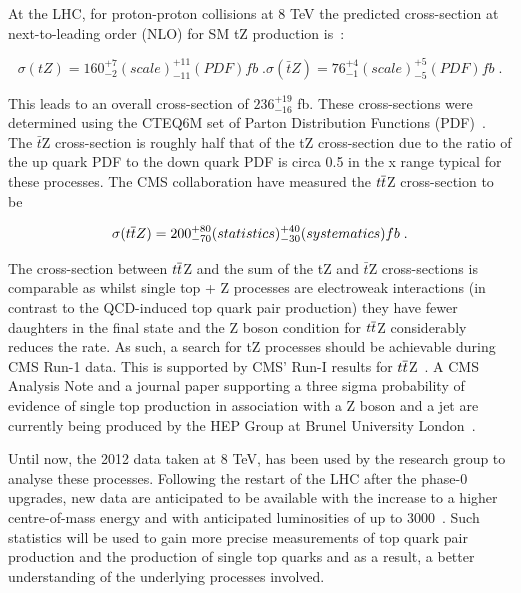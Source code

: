 At the LHC, for proton-proton collisions at 8 TeV the predicted cross-section at next-to-leading order (NLO) for SM tZ production is~\cite{Campbell:2013yla}:

\begin{equation}
\sigma(tZ)= 160_{-2}^{+7} (scale)_{-11}^{+11} (PDF) fb \;.
\sigma(\bar{t}Z)= 76_{-1}^{+4} (scale)_{-5}^{+5} (PDF) fb \;.
\end{equation}

This leads to an overall cross-section of $236_{-16}^{+19}$ fb. 
These cross-sections were determined using the CTEQ6M set of Parton Distribution Functions (PDF)~\cite{Pumplin:2002vw}. 
The $\bar{t}$Z cross-section is roughly half that of the tZ cross-section due to the ratio of the up quark PDF to the down quark PDF is circa 0.5 in the x range typical for these processes\cite{Campbell:2013yla}. 
The CMS collaboration have measured the $t\overline{t}$Z cross-section to be\cite{Khachatryan:2014ewa}

\begin{equation}
\sigma (t\overline{t} Z)= 200_{-70}^{+80} (statistics)_{-30}^{+40} (systematics) fb \;.
\end{equation}

The cross-section between $t\overline{t}$Z and the sum of the tZ and $\bar{t}$Z cross-sections is comparable as whilst single top + Z processes are electroweak interactions (in contrast to the QCD-induced top quark pair production) they have fewer daughters in the final state and the Z boson condition for $t\overline{t}$Z considerably reduces the rate\cite{Campbell:2013yla}.
As such, a search for tZ processes should be achievable during CMS Run-1 data. This is supported by CMS’ Run-I results for $t\overline{t}$Z~\cite{Khachatryan:2014ewa}. 
A CMS Analysis Note and a journal paper supporting a three sigma probability of evidence of single top production in association with a Z boson and a jet are currently being produced by the HEP Group at Brunel University London~\cite{Sirunyan:2017kkr}.

Until now, the 2012 data taken at 8 TeV, has been used by the research group to analyse these processes.
Following the restart of the LHC after the phase-0 upgrades, new data are anticipated to be available with the increase to a higher centre-of-mass energy and with anticipated luminosities of up to 3000~\fbinv\cite{ECFA}. 
Such statistics will be used to gain more precise measurements of top quark pair production and the production of single top quarks and as a result, a better understanding of the underlying processes involved.

